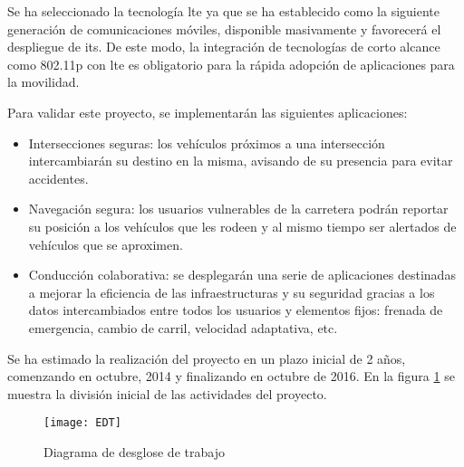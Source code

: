 Se ha seleccionado la tecnología \gls{lte} ya que se ha establecido como la siguiente generación de
comunicaciones móviles, disponible masivamente y favorecerá el despliegue de \gls{its}. De este modo,
la integración de tecnologías de corto alcance como \Gls{802.11p} con \gls{lte} es obligatorio para la
rápida adopción de aplicaciones para la movilidad.

Para validar este proyecto, se implementarán las siguientes aplicaciones:
\begin{itemize}
	\item Intersecciones seguras: los vehículos próximos a una intersección intercambiarán su destino en
	la misma, avisando de su presencia para evitar accidentes.

	\item Navegación segura: los usuarios vulnerables de la carretera podrán reportar su posición a los
	vehículos que les rodeen y al mismo tiempo ser alertados de vehículos que se aproximen.

	\item Conducción colaborativa: se desplegarán una serie de aplicaciones destinadas a mejorar la eficiencia
	de las infraestructuras y su seguridad gracias a los datos intercambiados entre todos los usuarios y elementos
	fijos: frenada de emergencia, cambio de carril, velocidad adaptativa, etc.
\end{itemize}

Se ha estimado la realización del proyecto en un plazo inicial de 2 años, comenzando en octubre, 2014 y
finalizando en octubre de 2016. En la figura \ref{fig:EDT} se muestra la división inicial de las actividades
del proyecto.

\begin{figure}[H]
	\begin{center}
		 {
		\texttt{[image: EDT]}
		}
		\caption{Diagrama de desglose de trabajo}
		\label{fig:EDT}
	\end{center}
\end{figure}
